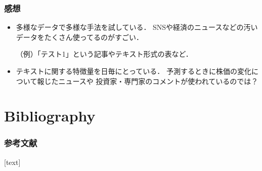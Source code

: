 \documentclass[12pt,noamssymb,usepdftitle=false]{beamer}
\begin{document}
\begin{frame}
    \frametitle{感想}
    \setlength{\leftmargini}{1em}
    \begin{itemize}
        \item 多様なデータで多様な手法を試している．
            SNSや経済のニュースなどの汚いデータをたくさん使ってるのがすごい．

            （例）「テスト1」という記事やテキスト形式の表など．

            \bigskip

        \item テキストに関する特徴量を日毎にとっている．
            予測するときに株価の変化について報じたニュースや
            投資家・専門家のコメントが使われているのでは？

    \end{itemize}
\end{frame}

\section{Bibliography}
\begin{frame}
\frametitle{参考文献}
    [text]
    \printbibliography
\end{frame}
\end{document}
